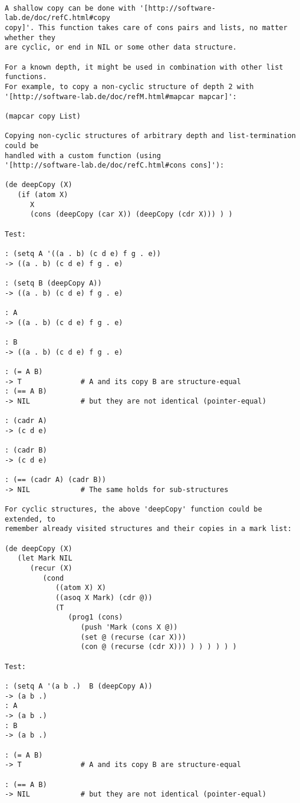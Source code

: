 \begin{verbatim}

A shallow copy can be done with '[http://software-lab.de/doc/refC.html#copy
copy]'. This function takes care of cons pairs and lists, no matter whether they
are cyclic, or end in NIL or some other data structure.

For a known depth, it might be used in combination with other list functions.
For example, to copy a non-cyclic structure of depth 2 with
'[http://software-lab.de/doc/refM.html#mapcar mapcar]':

(mapcar copy List)

Copying non-cyclic structures of arbitrary depth and list-termination could be
handled with a custom function (using
'[http://software-lab.de/doc/refC.html#cons cons]'):

(de deepCopy (X)
   (if (atom X)
      X
      (cons (deepCopy (car X)) (deepCopy (cdr X))) ) )

Test:

: (setq A '((a . b) (c d e) f g . e))
-> ((a . b) (c d e) f g . e)

: (setq B (deepCopy A))
-> ((a . b) (c d e) f g . e)

: A
-> ((a . b) (c d e) f g . e)

: B
-> ((a . b) (c d e) f g . e)

: (= A B)
-> T              # A and its copy B are structure-equal
: (== A B)
-> NIL            # but they are not identical (pointer-equal)

: (cadr A)
-> (c d e)

: (cadr B)
-> (c d e)

: (== (cadr A) (cadr B))
-> NIL            # The same holds for sub-structures

For cyclic structures, the above 'deepCopy' function could be extended, to
remember already visited structures and their copies in a mark list:

(de deepCopy (X)
   (let Mark NIL
      (recur (X)
         (cond
            ((atom X) X)
            ((asoq X Mark) (cdr @))
            (T
               (prog1 (cons)
                  (push 'Mark (cons X @))
                  (set @ (recurse (car X)))
                  (con @ (recurse (cdr X))) ) ) ) ) ) )

Test:

: (setq A '(a b .)  B (deepCopy A))
-> (a b .)
: A
-> (a b .)
: B
-> (a b .)

: (= A B)
-> T              # A and its copy B are structure-equal

: (== A B)
-> NIL            # but they are not identical (pointer-equal)

\end{verbatim}

